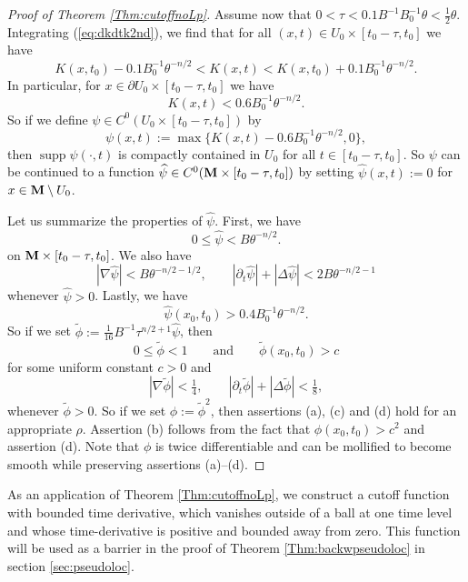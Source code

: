 \documentclass[11pt]{amsart}
\numberwithin{equation}{section}
\def\M{{\bf M}}
\DeclareMathOperator{\supp}{supp}
\numberwithin{equation}{section}
\begin{document}
\begin{proof}[Proof of Theorem \ref{Thm:cutoffnoLp}]
Assume now that $0 < \tau < 0.1 B^{-1} B_0^{-1} \theta < \frac12 \theta$.
Integrating (\ref{eq:dkdtk2nd}), we find that for all $(x,t) \in U_0 \times [t_0 - \tau, t_0]$ we have
\[ K(x, t_0 ) - 0.1 B_0^{-1} \theta^{-n/2} < K(x,t) < K(x, t_0 ) + 0.1 B_0^{-1} \theta^{-n/2} . \]
In particular, for $x \in \partial U_0 \times [t_0 - \tau, t_0]$ we have
\[ K(x,t) < 0.6 B_0^{-1} \theta^{-n/2}. \]
So if we define $\psi \in C^0 (U_0 \times [t_0 - \tau, t_0])$ by
\[ \psi (x,t) := \max \big\{ K(x,t) - 0.6 B_0^{-1} \theta^{-n/2}, 0 \big\}, \]
then $\supp \psi (\cdot, t)$ is compactly contained in $U_0$ for all $t \in [t_0 - \tau, t_0]$.
So $\psi$ can be continued to a function $\widehat{\psi} \in C^0 (\M \times [t_0 - \tau, t_0])$ by setting $\widehat{\psi} (x,t) := 0$ for $x \in \M \setminus U_0$.

Let us summarize the properties of $\widehat{\psi}$.
First, we have
\[ 0 \leq \widehat{\psi} < B \theta^{-n/2}. \]
on $\M \times [t_0 - \tau, t_0]$.
We also have
\[ |\nabla \widehat{\psi} | < B \theta^{-n/2 - 1/2}, \qquad |\partial_t \widehat{\psi}| + |\Delta \widehat{\psi} | < 2 B \theta^{-n/2 - 1} \]
whenever $\widehat{\psi} > 0$.
Lastly, we have
\[ \widehat{\psi} (x_0, t_0) > 0.4 B_0^{-1} \theta^{-n/2}. \]
So if we set $\widetilde{\phi} := \frac1{16} B^{-1} \tau^{n/2 +1}  \widehat{\psi}$, then
\[ 0 \leq \widetilde{\phi} < 1 \qquad \text{and} \qquad \widetilde{\phi} (x_0, t_0 ) > c  \]
for some uniform constant $c > 0$ and
\[  |\nabla \widetilde{\phi} | < \tfrac14, \qquad |\partial_t \widetilde{\phi} | + | \Delta \widetilde{\phi} | < \tfrac18, \]
whenever $\widetilde{\phi} > 0$.
So if we set $\phi := \widetilde{\phi}^2$, then assertions (a), (c) and (d) hold for an appropriate $\rho$.
Assertion (b) follows from the fact that $\phi (x_0, t_0) > c^2$ and assertion (d).
Note that $\phi$ is twice differentiable and can be mollified to become smooth while preserving assertions (a)--(d).
\end{proof}

As an application of Theorem \ref{Thm:cutoffnoLp}, we construct a cutoff function with bounded time derivative, which vanishes outside of a ball at one time level and whose time-derivative is positive and bounded away from zero.
This function will be used as a barrier in the proof of Theorem \ref{Thm:backwpseudoloc} in section \ref{sec:pseudoloc}.
\end{document}
